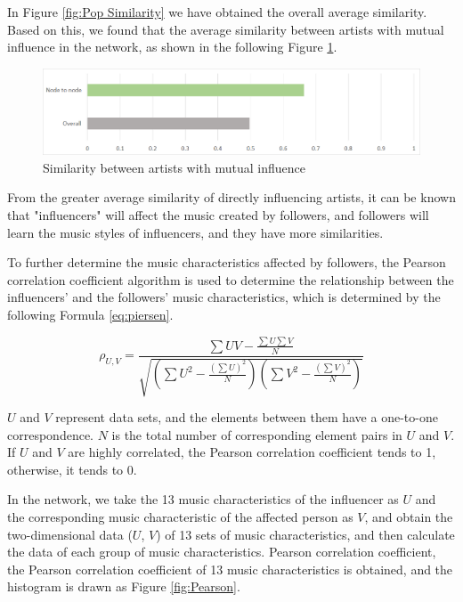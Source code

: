 \documentclass[12pt]{article}  %
\begin{document}
In Figure \ref{fig:Pop Similarity} we have obtained the overall average similarity. Based on this, we found that the average similarity between artists with mutual influence in the network, as shown in the following Figure \ref{fig:Overall vs Node to node}.

\begin{figure}[htbp]
\centering
\includegraphics[width=.7\textwidth]{img/Overall vs Node to node.jpg}
\caption{Similarity between artists with mutual influence}\label{fig:Overall vs Node to node}
\end{figure}

From the greater average similarity of directly influencing artists, it can be known that "influencers" will affect the music created by followers, and followers will learn the music styles of influencers, and they have more similarities. \par

To further determine the music characteristics affected by followers, the Pearson correlation coefficient algorithm is used to determine the relationship between the influencers’ and the followers’ music characteristics, which is determined by the following Formula  \ref{eq:piersen}.


\begin{equation}\label{eq:piersen}
    \rho_{U,V}=\frac{\sum UV-\frac{\sum U\sum V}{N}}{\sqrt{\left ( \sum U^{2}-\frac{\left ( \sum U \right )^{2}}{N} \right )\left ( \sum V^{2}-\frac{\left ( \sum V \right )^{2}}{N} \right )}}
\end{equation}

$U$ and $V$ represent data sets, and the elements between them have a one-to-one correspondence. $N$ is the total number of corresponding element pairs in $U$ and $V$. If $U$ and $V$ are highly correlated, the Pearson correlation coefficient tends to 1, otherwise, it tends to 0. \par

In the network, we take the 13 music characteristics of the influencer as $U$ and the corresponding music characteristic of the affected person as $V$, and obtain the two-dimensional data ($U$, $V$) of 13 sets of music characteristics, and then calculate the data of each group of music characteristics. Pearson correlation coefficient, the Pearson correlation coefficient of 13 music characteristics is obtained, and the histogram is drawn as Figure \ref{fig:Pearson}.
\end{document}
